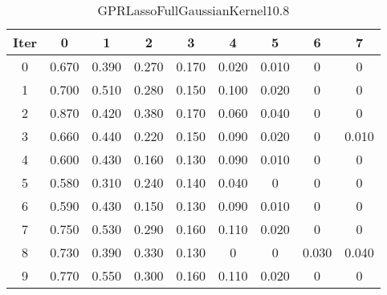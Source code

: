\begin{table}
	\begin{center}
		\begin{tabular}{|c|c|c|c|c|c|c|c|c|}
			\hline
			Iter & 0 & 1 & 2 & 3 & 4 & 5 & 6 & 7 \\
			\hline
			0 & 0.670 & 0.390 & 0.270 & 0.170 & 0.020 & 0.010 & 0 & 0 \\
			\hline
			1 & 0.700 & 0.510 & 0.280 & 0.150 & 0.100 & 0.020 & 0 & 0 \\
			\hline
			2 & 0.870 & 0.420 & 0.380 & 0.170 & 0.060 & 0.040 & 0 & 0 \\
			\hline
			3 & 0.660 & 0.440 & 0.220 & 0.150 & 0.090 & 0.020 & 0 & 0.010 \\
			\hline
			4 & 0.600 & 0.430 & 0.160 & 0.130 & 0.090 & 0.010 & 0 & 0 \\
			\hline
			5 & 0.580 & 0.310 & 0.240 & 0.140 & 0.040 & 0 & 0 & 0 \\
			\hline
			6 & 0.590 & 0.430 & 0.150 & 0.130 & 0.090 & 0.010 & 0 & 0 \\
			\hline
			7 & 0.750 & 0.530 & 0.290 & 0.160 & 0.110 & 0.020 & 0 & 0 \\
			\hline
			8 & 0.730 & 0.390 & 0.330 & 0.130 & 0 & 0 & 0.030 & 0.040 \\
			\hline
			9 & 0.770 & 0.550 & 0.300 & 0.160 & 0.110 & 0.020 & 0 & 0 \\
			\hline
		\end{tabular}
	\end{center}
	\caption{GPRLassoFullGaussianKernel10.8}
\end{table}